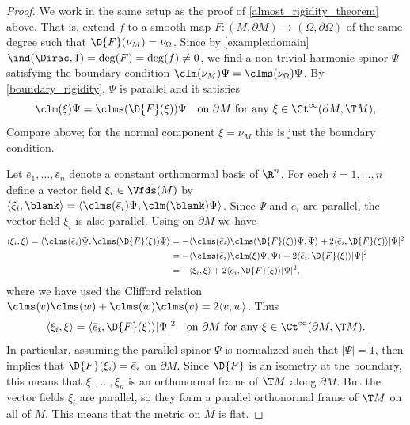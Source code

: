 \documentclass[a4paper,11pt]{amsart}
\numberwithin{equation}{section}
\begin{document}
\begin{proof}
    We work in the same setup as the proof of \cref{almost_rigidity_theorem} above.
    That is, extend $f$ to a smooth map \(F\colon (M, \partial M) \to (\Omega, \partial \Omega)\) of the same degree such that \(\D{F}(\nu_M) = \nu_\Omega\).    
    Since by \cref{example:domain} \(\ind(\Dirac, 1) = \deg(F) = \deg(f) \neq 0\), we find a non-trivial harmonic spinor \(\Psi\) satisfying the boundary condition \(\clm(\nu_M) \Psi = \clms(\nu_\Omega) \Psi\).
    By \cref{boundary_rigidity}, $\Psi$ is parallel and it satisfies 
    \begin{equation}
        \clm(\xi) \Psi = \clms(\D{F} (\xi)) \Psi \quad \text{on \(\partial M\) for any \(\xi \in \Ct^\infty(\partial M, \T M)\),} \label{eq:clifford_action_total_rigidity}
    \end{equation}
    Compare  above; for the normal component \(\xi = \nu_M\) this is just the boundary condition.


    
    Let \(\bar{e}_1, \dotsc, \bar{e}_n\) denote a constant orthonormal basis of \(\R^n\).
    For each \(i = 1, \dotsc, n\) define a vector field \(\xi_i \in \Vfds(M)\) by \(\langle \xi_i, \blank \rangle = \langle \clms(\bar{e}_i) \Psi, \clm(\blank) \Psi \rangle\).
    Since \(\Psi\) and \(\bar{e}_i\) are parallel, the vector field \(\xi_i\) is also parallel.
    Using  on \(\partial M\) we have
    \begin{align*}
        \langle \xi_i, \xi \rangle = \langle \clms(\bar{e}_i) \Psi, \clms(\D{F}(\xi)) \Psi \rangle &= -\langle \clms(\bar{e}_i) \clms(\D{F}(\xi)) \Psi, \Psi \rangle + 2 \langle \bar{e}_i, \D{F}(\xi) \rangle \lvert \Psi \rvert^2 \\
        &= -\langle \clms(\bar{e}_i) \clm(\xi) \Psi, \Psi \rangle + 2 \langle \bar{e}_i, \D{F}(\xi) \rangle \lvert \Psi \rvert^2\\
        &= -\langle \xi_i, \xi \rangle + 2 \langle \bar{e}_i, \D{F}(\xi) \rangle \lvert \Psi \rvert^2,
    \end{align*}
    where we have used the Clifford relation \(\clms(v)\clms(w) + \clms(w)\clms(v) = 2 \langle v, w \rangle\).
    Thus
    \begin{equation}
        \langle \xi_i, \xi \rangle = \langle \bar{e}_i, \D{F}(\xi) \rangle \lvert \Psi \rvert^2 \quad \text{on \(\partial M\) for any \(\xi \in \Ct^\infty(\partial M, \T M)\).} \label{eq:vf_boundary_relation}
    \end{equation}
    In particular, assuming the parallel spinor \(\Psi\) is normalized such that \(|\Psi| = 1\), then  implies that \(\D{F}(\xi_i) = \bar{e}_i\) on \(\partial M\).
    Since \(\D{F}\) is an isometry at the boundary, this means that \(\xi_1, \dotsc, \xi_n\) is an orthonormal frame of \(\T M\) along \(\partial M\).
    But the vector fields \(\xi_i\) are parallel, so they form a parallel orthonormal frame of \(\T M\) on all of \(M\). This means that the metric on \(M\) is flat.


\end{proof}
\end{document}
